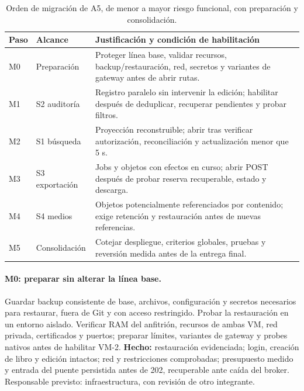 \begin{table}[H]
\centering\small
\begin{tabularx}{\textwidth}{>{\raggedright\arraybackslash}p{1.1cm} >{\raggedright\arraybackslash}p{2.7cm} >{\raggedright\arraybackslash}X}
\toprule
\textbf{Paso} & \textbf{Alcance} & \textbf{Justificación y condición de habilitación} \\
\midrule
M0 & Preparación & Proteger línea base, validar recursos, backup/restauración, red, secretos y variantes de gateway antes de abrir rutas. \\
M1 & S2 auditoría & Registro paralelo sin intervenir la edición; habilitar después de deduplicar, recuperar pendientes y probar filtros. \\
M2 & S1 búsqueda & Proyección reconstruible; abrir tras verificar autorización, reconciliación y actualización menor que 5 s. \\
M3 & S3 exportación & Jobs y objetos con efectos en curso; abrir POST después de probar reserva recuperable, estado y descarga. \\
M4 & S4 medios & Objetos potencialmente referenciados por contenido; exige retención y restauración antes de nuevas referencias. \\
M5 & Consolidación & Cotejar despliegue, criterios globales, pruebas y reversión medida antes de la entrega final. \\
\bottomrule
\end{tabularx}
\caption{Orden de migración de A5, de menor a mayor riesgo funcional, con preparación y consolidación.}
\label{tab:a5-orden}
\end{table}

\clearpage
\paragraph{M0: preparar sin alterar la línea base.}
Guardar backup consistente de base, archivos, configuración y secretos
necesarios para restaurar, fuera de Git y con acceso restringido. Probar la
restauración en un entorno aislado. Verificar RAM del anfitrión, recursos
de ambas VM, red privada, certificados y puertos; preparar límites,
variantes de gateway y probes nativos antes de habilitar VM-2.
\textbf{Hecho:} restauración evidenciada; login, creación de libro y edición
intactos; red y restricciones comprobadas; presupuesto medido y entrada del
puente persistida antes de 202, recuperable ante caída del broker.
Responsable previsto: infraestructura, con revisión de otro integrante.

